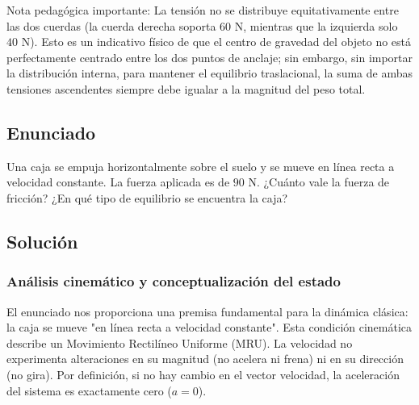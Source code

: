 \documentclass[12pt, a4paper]{article}
\begin{document}
Nota pedagógica importante: La tensión no se distribuye equitativamente entre las dos cuerdas (la cuerda derecha soporta $60 \text{ N}$, mientras que la izquierda solo $40 \text{ N}$). Esto es un indicativo físico de que el centro de gravedad del objeto no está perfectamente centrado entre los dos puntos de anclaje; sin embargo, sin importar la distribución interna, para mantener el equilibrio traslacional, la suma de ambas tensiones ascendentes siempre debe igualar a la magnitud del peso total.

\newpage

\subsection*{Enunciado}
Una caja se empuja horizontalmente sobre el suelo y se mueve en línea recta a velocidad constante. La fuerza aplicada es de $90 \text{ N}$. ¿Cuánto vale la fuerza de fricción? ¿En qué tipo de equilibrio se encuentra la caja?

\begin{center}
\end{center}

\subsection*{Solución}

\subsubsection*{Análisis cinemático y conceptualización del estado}
El enunciado nos proporciona una premisa fundamental para la dinámica clásica: la caja se mueve "en línea recta a velocidad constante". Esta condición cinemática describe un Movimiento Rectilíneo Uniforme (MRU). La velocidad no experimenta alteraciones en su magnitud (no acelera ni frena) ni en su dirección (no gira). Por definición, si no hay cambio en el vector velocidad, la aceleración del sistema es exactamente cero ($a = 0$). 
\end{document}

